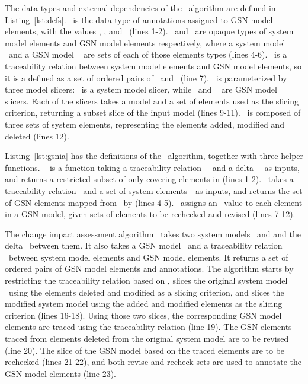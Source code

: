 The data types and external dependencies of the \CIA~algorithm are defined in Listing~\ref{lst:defs}. \Annotation~is the data type of annotations assigned to GSN model elements, with the values \Reuse, \Recheck, and \Revise~(lines 1-2). \SysEl~and \GSNEl~are opaque types of system model elements and GSN model elements respectively, where a system model \Sys~and a GSN model \GSN~ are sets of each of those elements types (lines 4-6). \TraceRel~is a traceability relation between system model elements and GSN model elements, so it is a defined as a set of ordered pairs of \SysEl~and \GSNEl~(line 7). \CIA~is parameterized by three model slicers: \sliceSys~is a system model slicer, while \sliceGSNV~and \sliceGSNR~ are GSN model slicers. 
Each of the slicers takes a model and a set of elements used as the slicing criterion, returning a subset slice of the input model (lines 9-11). \Dlta~is composed of three sets of system elements, representing the elements added, modified and deleted (lines 12).



Listing~\ref{lst:gsnia} has the definitions of the \CIA~algorithm, together with three helper functions. \restrict~ is a function taking a traceability relation ~~and a delta ~~as inputs, and returns a restricted subset of  only covering elements in  (lines 1-2). \trace~takes a traceability relation ~and a set of system elements~~as inputs, and returns the set of GSN elements mapped from ~by  (lines 4-5). \createAnnotation~assigns an \Annotation~value to each element in a GSN model, given sets of elements to be rechecked and revised (lines 7-12).

%

The change impact assessment algorithm \CIA~takes two system models ~and  and the delta ~between them. It also takes a GSN model ~and a traceability relation ~between system model elements and GSN model elements. It returns a set of ordered pairs of GSN model elements and annotations. The algorithm starts by restricting the traceability relation based on , slices the original system model ~using the elements deleted and modified as a slicing criterion, and slices the modified system model  using the added and modified elements as the slicing criterion (lines 16-18). Using those two slices, the corresponding GSN model elements are traced using the traceability relation (line 19). The GSN elements traced from elements deleted from the original system model are to be revised (line 20). The slice of the GSN model based on the traced elements are to be rechecked (lines 21-22), and both revise and recheck sets are used to annotate the GSN model elements (line 23). 


